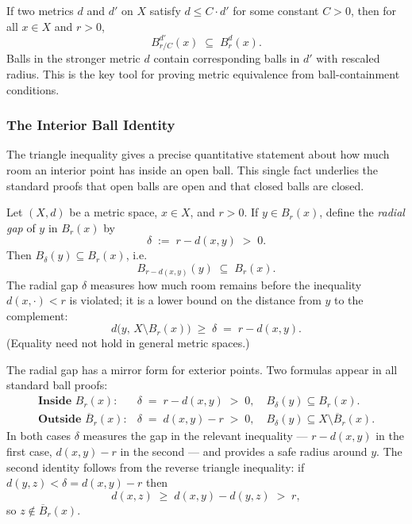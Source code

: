 \begin{remark*}
If two metrics $d$ and $d'$ on $X$ satisfy $d \le C \cdot d'$ for some
constant $C > 0$, then for all $x\in X$ and $r>0$,
\[
B^{d'}_{r/C}(x) \;\subseteq\; B^d_r(x).
\]
Balls in the stronger metric $d$ contain corresponding balls in $d'$
with rescaled radius.
This is the key tool for proving metric equivalence from ball-containment
conditions.
\end{remark*}


\subsubsection*{The Interior Ball Identity}

The triangle inequality gives a precise quantitative statement
about how much room an interior point has inside an open ball.
This single fact underlies the standard proofs that open balls
are open and that closed balls are closed.

\begin{remark*}
\label{rem:interior-ball-identity}
Let $(X,d)$ be a metric space, $x\in X$, and $r>0$.
If $y\in B_r(x)$, define the \emph{radial gap} of $y$ in $B_r(x)$ by
\[
\delta \;:=\; r - d(x,y) \;>\; 0.
\]
Then $B_\delta(y) \subseteq B_r(x)$, i.e.\
\[
B_{r-d(x,y)}(y) \;\subseteq\; B_r(x).
\]
The radial gap $\delta$ measures how much room remains before the
inequality $d(x,\cdot) < r$ is violated; it is a lower bound on the
distance from $y$ to the complement:
\[
d\bigl(y,\, X\setminus B_r(x)\bigr) \;\ge\; \delta \;=\; r - d(x,y).
\]
(Equality need not hold in general metric spaces.)
\end{remark*}

\bigskip

\bigskip

\begin{remark*}
The radial gap has a mirror form for exterior points.
Two formulas appear in all standard ball proofs:
\[
\begin{array}{ll}
\textbf{Inside }B_r(x): & \delta \;=\; r - d(x,y) \;>\; 0,
  \quad B_\delta(y)\subseteq B_r(x). \\[6pt]
\textbf{Outside }\overline{B}_r(x): & \delta \;=\; d(x,y) - r \;>\; 0,
  \quad B_\delta(y)\subseteq X\setminus\overline{B}_r(x).
\end{array}
\]
In both cases $\delta$ measures the gap in the relevant inequality ---
$r - d(x,y)$ in the first case, $d(x,y) - r$ in the second --- and
provides a safe radius around $y$.
The second identity follows from the reverse triangle inequality:
if $d(y,z) < \delta = d(x,y) - r$ then
\[
d(x,z) \;\ge\; d(x,y) - d(y,z) \;>\; r,
\]
so $z\notin\overline{B}_r(x)$.
\end{remark*}

